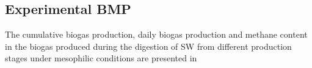 \subsection{Experimental BMP}
The cumulative biogas production, daily biogas production and methane content in the biogas produced during the digestion of SW from different production stages under mesophilic conditions are presented in 